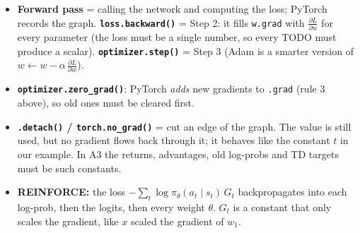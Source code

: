 \documentclass[11pt,a4paper]{article}
\newcommand{\pd}[2]{\frac{\partial #1}{\partial #2}}
\newcommand{\code}[1]{\texttt{#1}}
\begin{document}
\begin{itemize}[nosep]
  \item \textbf{Forward pass} = calling the network and computing the loss; PyTorch records the graph. \textbf{\code{loss.backward()}} = Step 2: it fills \code{w.grad} with $\pd{L}{w}$ for every parameter (the loss must be a single number, so every TODO must produce a scalar). \textbf{\code{optimizer.step()}} = Step 3 (Adam is a smarter version of $w\gets w-\alpha\,\pd{L}{w}$).
  \item \textbf{\code{optimizer.zero\_grad()}}: PyTorch \emph{adds} new gradients to \code{.grad} (rule 3 above), so old ones must be cleared first.
  \item \textbf{\code{.detach()} / \code{torch.no\_grad()}} = cut an edge of the graph. The value is still used, but no gradient flows back through it; it behaves like the constant $t$ in our example. In A3 the returns, advantages, old log-probs and TD targets must be such constants.
  \item \textbf{REINFORCE:} the loss $-\sum_t \log\pi_\theta(a_t\mid s_t)\,G_t$ backpropagates into each log-prob, then the logits, then every weight $\theta$. $G_t$ is a constant that only scales the gradient, like $x$ scaled the gradient of $w_1$.
\end{itemize}
\end{document}
